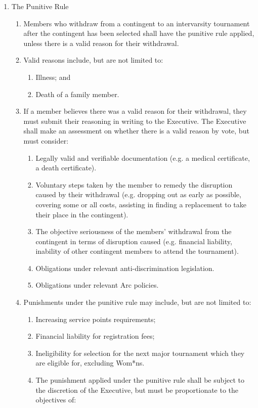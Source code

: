 \begin{enumerate}
\item The Punitive Rule
  \begin{enumerate}
  \item Members who withdraw from a contingent to an intervarsity tournament after the contingent has been selected shall have the punitive rule applied, unless there is a valid reason for their withdrawal.
  \item Valid reasons include, but are not limited to:
    \begin{enumerate}
    \item Illness; and
    \item Death of a family member.
    \end{enumerate}
  \item If a member believes there was a valid reason for their withdrawal, they must submit their reasoning in writing to the Executive. The Executive shall make an assessment on whether there is a valid reason by vote, but must consider:
    \begin{enumerate}
    \item Legally valid and verifiable documentation (e.g. a medical certificate, a death certificate).
    \item Voluntary steps taken by the member to remedy the disruption caused by their withdrawal (e.g. dropping out as early as possible, covering some or all costs, assisting in finding a replacement to take their place in the contingent).
    \item The objective seriousness of the members’ withdrawal from the contingent in terms of disruption caused (e.g. financial liability, inability of other contingent members to attend the tournament).
    \item Obligations under relevant anti-discrimination legislation.
    \item Obligations under relevant Arc policies.
    \end{enumerate}
  \item Punishments under the punitive rule may include, but are not limited to:
    \begin{enumerate}
    \item Increasing service points requirements;
    \item Financial liability for registration fees;
    \item Ineligibility for selection for the next major tournament which they are eligible for, excluding Wom*ns.
    \item The punishment applied under the punitive rule shall be subject to the discretion of the Executive, but must be proportionate to the objectives of:

\end{enumerate}
\end{enumerate}
\end{enumerate}
